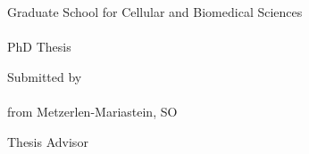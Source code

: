 \thispagestyle{empty}
\begin{addmargin}[-1cm]{-3cm}
    \begin{center}
        \large  

        \vfill

		\begingroup
			\color{Maroon}\spacedallcaps{\myTitle} \\ \bigskip
		\endgroup
		\myDegree \\
		\vspace{2cm}
		Graduate School for Cellular and Biomedical Sciences\\
		\myUni\\
		PhD Thesis 

		\vfill


		Submitted by\\
		\medskip
		\spacedallcaps{\myName}\\
		\medskip
		from Metzerlen-Mariastein, SO\\

		\vfill

		Thesis Advisor\\
		\medskip
		\myProf \\
		\myDepartment \\                            
       	\myFaculty \\
       	\myUni \\
		\bigskip
       	\myTime
    \end{center}
\end{addmargin}